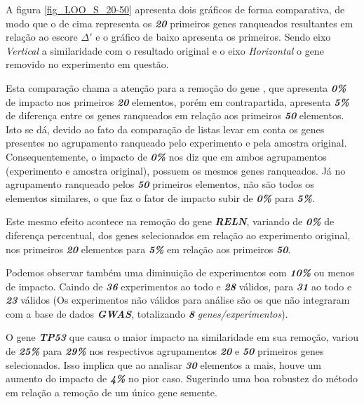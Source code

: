 A figura \ref{fig_LOO_S_20-50} apresenta dois gráficos de forma comparativa, de modo que o de cima representa os \textbf{\textit{20}} primeiros genes ranqueados resultantes em relação ao escore $\Delta'$ e o gráfico de baixo apresenta os \textbf{} primeiros. Sendo eixo \textit{Vertical} a similaridade com o resultado original e o eixo \textit{Horizontal} o gene removido no experimento em questão.
%

Esta comparação chama a atenção para a remoção do gene \textbf{}, que apresenta \textbf{\textit{0\%}} de impacto nos primeiros \textbf{\textit{20}} elementos, porém em contrapartida, apresenta \textbf{\textit{5\%}} de diferença entre os genes ranqueados em relação aos primeiros \textbf{\textit{50}} elementos. Isto se dá, devido ao fato da comparação de listas levar em conta os genes presentes no agrupamento ranqueado pelo experimento e pela amostra original. Consequentemente, o impacto de \textbf{\textit{0\%}} nos diz que em ambos agrupamentos (experimento e amostra original), possuem os mesmos genes ranqueados. Já no agrupamento ranqueado pelos \textbf{\textit{50}} primeiros elementos, não são todos os elementos similares, o que faz o fator de impacto subir de \textbf{\textit{0\%}} para \textbf{\textit{5\%}}.
%

Este mesmo efeito acontece na remoção do gene \textbf{\textit{RELN}}, variando de \textbf{\textit{0\%}} de diferença percentual, dos genes selecionados em relação ao experimento original, nos primeiros \textbf{\textit{20}} elementos para \textbf{\textit{5\%}} em relação aos primeiros \textbf{\textit{50}}.
%

Podemos observar também uma diminuição de experimentos com \textbf{\textit{10\%}} ou menos de impacto. Caindo de \textbf{\textit{36}} experimentos ao todo e \textbf{\textit{28}} válidos, para \textbf{\textit{31}} ao todo e \textbf{\textit{23}} válidos (Os experimentos não válidos para análise são os que não integraram com a base de dados \textbf{\textit{GWAS}}, totalizando \textbf{\textit{8}} \textit{genes/experimentos}).
%

O gene \textbf{\textit{TP53}} que causa o maior impacto na similaridade em sua remoção, variou de \textbf{\textit{25\%}} para \textbf{\textit{29\%}} nos respectivos agrupamentos \textbf{\textit{20}} e \textbf{\textit{50}} primeiros genes selecionados. Isso implica que ao analisar \textbf{\textit{30}} elementos a mais, houve um aumento do impacto de \textbf{\textit{4\%}} no pior caso. Sugerindo uma boa robustez do método em relação a remoção de um único gene semente.
%

